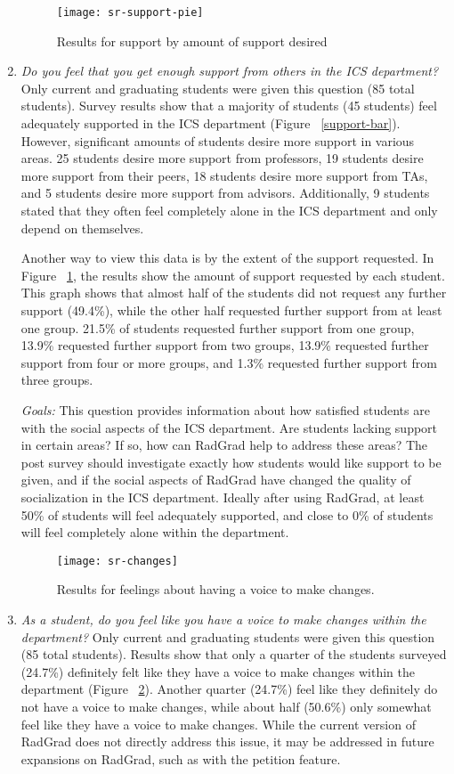\begin{enumerate}
\begin{figure}[h]
\centering
\texttt{[image: sr-support-pie]}
\caption{Results for support by amount of support desired}
\label{support-pie}
\end{figure}
\item \textit{Do you feel that you get enough support from others in the ICS department?}
Only current and graduating students were given this question (85 total students). Survey results show that a majority of students (45 students) feel adequately supported in the ICS department (Figure ~\ref{support-bar}). However, significant amounts of students desire more support in various areas. 25 students desire more support from professors, 19 students desire more support from their peers, 18 students desire more support from TAs, and 5 students desire more support from advisors. Additionally, 9 students stated that they often feel completely alone in the ICS department and only depend on themselves. 

Another way to view this data is by the extent of the support requested. In Figure ~\ref{support-pie}, the results show the amount of support requested by each student. This graph shows that almost half of the students did not request any further support (49.4\%), while the other half requested further support from at least one group. 21.5\% of students requested further support from one group, 13.9\% requested further support from two groups, 13.9\% requested further support from four or more groups, and 1.3\% requested further support from three groups.  

\textit{Goals:} This question provides information about how satisfied students are with the social aspects of the ICS department. Are students lacking support in certain areas? If so, how can RadGrad help to address these areas? The post survey should investigate exactly how students would like support to be given, and if the social aspects of RadGrad have changed the quality of socialization in the ICS department. Ideally after using RadGrad, at least 50\% of students will feel adequately supported, and close to 0\% of students will feel completely alone within the department.

\begin{figure}[h]
\centering
\texttt{[image: sr-changes]}
\caption{Results for feelings about having a voice to make changes.}
\label{changes}
\end{figure}
\item \textit{As a student, do you feel like you have a voice to make changes within the department?}
Only current and graduating students were given this question (85 total students). Results show that only a quarter of the students surveyed (24.7\%) definitely felt like they have a voice to make changes within the department (Figure ~\ref{changes}). Another quarter (24.7\%) feel like they definitely do not have a voice to make changes, while about half (50.6\%) only somewhat feel like they have a voice to make changes. While the current version of RadGrad does not directly address this issue, it may be addressed in future expansions on RadGrad, such as with the petition feature. 


\end{enumerate}
